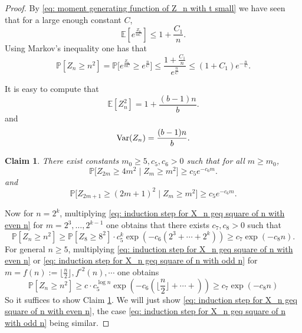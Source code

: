 \documentclass[12pt]{article}
\newtheorem{claim}[theorem]{Claim}
\numberwithin{equation}{section}
\newcommand{\be}{\begin{equation}}
\newcommand{\ee}{\end{equation}}
\newcommand{\1}{\mathbf{1}}
\begin{document}
\begin{proof}
	 By \eqref{eq: moment generating function of Z_n  with t small} we have seen that for a large enough constant $C$,
	\[
	\mathbb{E}[e^{\frac{Z_n}{nC}}]\leq 1+\frac{C_1}{n}.
	\]
	Using Markov's inequality one has that 
	\[
	\mathbb{P}[Z_n\geq n^2]=\mathbb{P}\big[e^{\frac{Z_n}{nC}}\geq e^{\frac{n}{C}}\big]
	\leq \frac{1+\frac{C_1}{n}}{e^{\frac{n}{C}}}\leq (1+C_1)e^{-\frac{n}{C}}.
	\]
	
	
	It is easy to compute that 
		\[
		\mathbb{E}[Z_n^2]=1+\frac{(b-1)n}{b}.
		\]
		and \[
		\textnormal{Var}(Z_n)=\frac{(b-1)n}{b}.
		\]
	\begin{claim}\label{claim: 2}
	There exist constants $m_0\geq 5,c_5,c_6>0$ such that for all $m\ge m_0$,
	\be\label{eq: induction step for X_n geq square of n with even n}
	\mathbb{P}\big[Z_{2m}\geq 4m^2 \mid Z_{m}\geq m^2\big]\geq c_5e^{-c_6m}.
	\ee
	and
	\be\label{eq: induction step for X_n geq square of n with odd n}
	\mathbb{P}\big[Z_{2m+1}\geq (2m+1)^2 \mid Z_{m}\geq m^2\big]\geq c_5e^{-c_6m}.
	\ee
\end{claim} 
	Now for $n=2^k$, multiplying \eqref{eq: induction step for X_n geq square of n with even n} for $m=2^3,\ldots,2^{k-1}$ one obtains that there exists $c_7,c_8>0$ such that 
	\[
	\mathbb{P}[Z_n\geq n^2]\geq \mathbb{P}[Z_8\geq 8^2]\cdot c_5^k\exp(-c_6(2^3+\cdots+2^k))\geq c_7\exp(-c_8n).
	\]
	For general $n\geq5$, multiplying \eqref{eq: induction step for X_n geq square of n with even n} or \eqref{eq: induction step for X_n geq square of n with odd n} for $m=f(n):=\lfloor \frac{n}{2}\rfloor, f^{\circ 2}(n),\cdots$ one obtains
	\[
	\mathbb{P}[Z_n\geq n^2]\geq c\cdot c_5^{\log n}\exp(-c_6(\lfloor \frac{n}{2}\rfloor+\cdots +))
	\geq c_7\exp(-c_8n)
	\]
	So it suffices to show Claim \ref{claim: 2}. We will just show \eqref{eq: induction step for X_n geq square of n with even n}, the case \eqref{eq: induction step for X_n geq square of n with odd n} being similar.
	

\end{proof}
\end{document}
